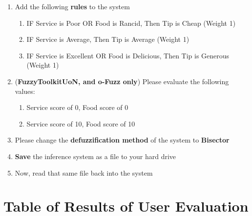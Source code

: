 \begin{enumerate}
\begin{enumerate}
\begin{tabular}{ll}
	\end{tabular}			
	\end{enumerate}	
\item Add the following \textbf{rules} to the system
	\begin{enumerate}
	\item IF Service is Poor OR Food is Rancid, Then Tip is Cheap (Weight 1)
	\item IF Service is Average, Then Tip is Average (Weight 1)
	\item IF Service is Excellent OR Food is Delicious, Then Tip is Generous (Weight 1)
	\end{enumerate}
\item (\textbf{FuzzyToolkitUoN, and o-Fuzz only}) Please evaluate the following values:
	\begin{enumerate}
	\item Service score of 0, Food score of 0
	\item Service score of 10, Food score of 10
	\end{enumerate}
\item Please change the \textbf{defuzzification method}	of the system to \textbf{Bisector}
\item \textbf{Save} the inference system as a file to your hard drive
\item Now, read that same file back into the system
\end{enumerate}

\newpage
\section{Table of Results of User Evaluation}